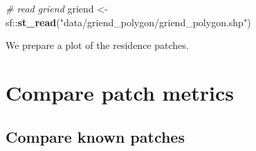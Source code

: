 \documentclass[
]{scrreprt}
\newenvironment{Shaded}{}{}
\newcommand{\CommentTok}[1]{\textcolor[rgb]{0.38,0.63,0.69}{\textit{#1}}}
\newcommand{\KeywordTok}[1]{\textcolor[rgb]{0.00,0.44,0.13}{\textbf{#1}}}
\newcommand{\NormalTok}[1]{#1}
\newcommand{\OperatorTok}[1]{\textcolor[rgb]{0.40,0.40,0.40}{#1}}
\newcommand{\StringTok}[1]{\textcolor[rgb]{0.25,0.44,0.63}{#1}}
\begin{document}
\begin{Shaded}
\begin{Highlighting}[]
\CommentTok{\# read griend}
\NormalTok{griend <{-}}\StringTok{ }\NormalTok{sf}\OperatorTok{::}\KeywordTok{st\_read}\NormalTok{(}\StringTok{"data/griend\_polygon/griend\_polygon.shp"}\NormalTok{)}
\end{Highlighting}
\end{Shaded}

We prepare a plot of the residence patches.

\hypertarget{compare-patch-metrics}{%
\section{Compare patch metrics}\label{compare-patch-metrics}}

\hypertarget{compare-known-patches}{%
\subsection{Compare known patches}\label{compare-known-patches}}
\end{document}
